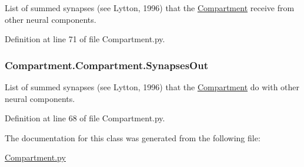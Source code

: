 List of summed synapses (see Lytton, 1996) that the \hyperlink{class_compartment_1_1_compartment}{Compartment} receive from other neural components. 



Definition at line 71 of file Compartment.\+py.

\subsubsection[{\texorpdfstring{Synapses\+Out}{SynapsesOut}}]{\setlength{\rightskip}{0pt plus 5cm}Compartment.\+Compartment.\+Synapses\+Out}\hypertarget{class_compartment_1_1_compartment_a85d64ebf548276c873501d2dc3489ceb}{}\label{class_compartment_1_1_compartment_a85d64ebf548276c873501d2dc3489ceb}


List of summed synapses (see Lytton, 1996) that the \hyperlink{class_compartment_1_1_compartment}{Compartment} do with other neural components. 



Definition at line 68 of file Compartment.\+py.



The documentation for this class was generated from the following file\+:\begin{DoxyCompactItemize}
\item 
\hyperlink{_compartment_8py}{Compartment.\+py}\end{DoxyCompactItemize}
